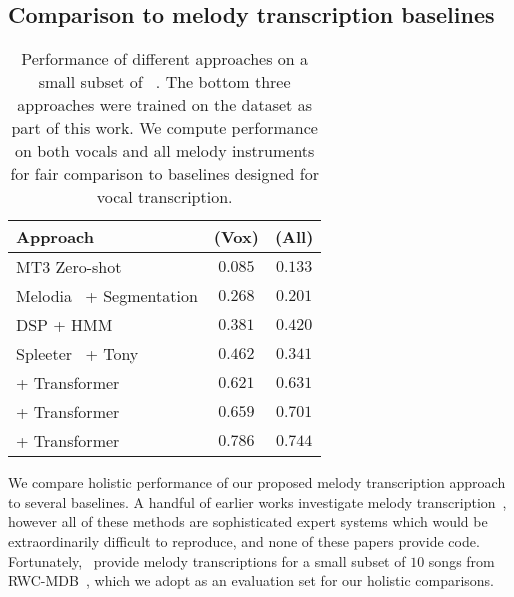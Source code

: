 \subsection{Comparison to melody transcription baselines}

\begin{table}[t]
    \centering
    \begin{tabular}{lcc}
\toprule
Approach & \fone{} (Vox) & \fone{} (All) \\
\midrule
MT3 Zero-shot~\cite{gardner2021mt3} & $0.085$ & $0.133$ \\
Melodia~\cite{salamon2014melody} + Segmentation & $0.268$ & $0.201$ \\
DSP + HMM~\cite{ryynanen2006transcription,ryynanen2008automatic} & $0.381$ & $0.420$ \\
Spleeter~\cite{hennequin2020spleeter} + Tony~\cite{mauch2015computer} & $0.462$ & $0.341$ \\
\midrule
\mel{} + Transformer & $0.621$ & $0.631$ \\
\mtthree{} + Transformer & $0.659$ & $0.701$ \\
\jukebox{} + Transformer & $\mathbf{0.786}$ & $\mathbf{0.744}$ \\
\bottomrule
    \end{tabular}
    \caption{Performance of different approaches on a small subset of \rwc~\cite{goto2002rwc,goto2003rwc,goto2004development}. The bottom three approaches were trained on the \hooktheory{} dataset as part of this work. We compute performance on both vocals and all melody instruments for fair comparison to baselines designed for vocal transcription.}
    \label{tab:rwc_ryy}
\end{table}

We compare holistic performance of our proposed melody transcription approach to several baselines. 
A handful of earlier works investigate melody transcription~\cite{ryynanen2008automatic,weil2009automatic,laaksonen2014automatic}, however all of these methods are sophisticated expert systems which would be extraordinarily difficult to reproduce, and none of these papers provide code. 
Fortunately,~\cite{ryynanen2008automatic} provide melody transcriptions for a small subset of $10$ songs from RWC-MDB~\cite{goto2002rwc,goto2003rwc,goto2004development}, 
which we adopt as an evaluation set for our holistic comparisons.

